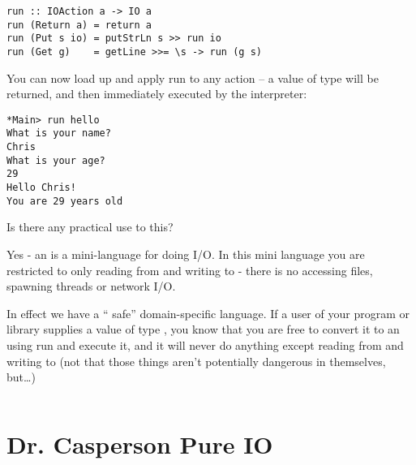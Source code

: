 \documentclass[thesis-solanki.tex]{subfiles}
\begin{document}
\begin{verbatim}
run :: IOAction a -> IO a
run (Return a) = return a
run (Put s io) = putStrLn s >> run io
run (Get g)    = getLine >>= \s -> run (g s)
\end{verbatim}

You can now load up  and apply run to any action –
a value of type   will be returned, and then immediately executed by the 
interpreter:

\begin{verbatim}
*Main> run hello
What is your name?
Chris
What is your age?
29
Hello Chris!
You are 29 years old

\end{verbatim}
Is there any practical use to this?

Yes -
an  is a mini-language for doing I/O. In this mini language you are restricted to only reading from  and writing to  -
there is no accessing files, spawning threads or network I/O.

In effect we have a “
safe” domain-specific language.
If a user of your program or library supplies a value of type  , you know that you are free to convert it to an   using run and execute it, 
and it will never do anything except reading from  and writing to  (not that those things aren’t potentially dangerous in themselves, but…)


\begin{singlespace}
  \inputminted[linenos]{haskell}{haskell-proto4-purvey-wincer.hs}
\end{singlespace}

\section{Dr. Casperson Pure IO}
\begin{singlespace}
  \inputminted[linenos]{haskell}{haskell-proto4-myrtle-uppers.hs}
\end{singlespace}
\end{document}
